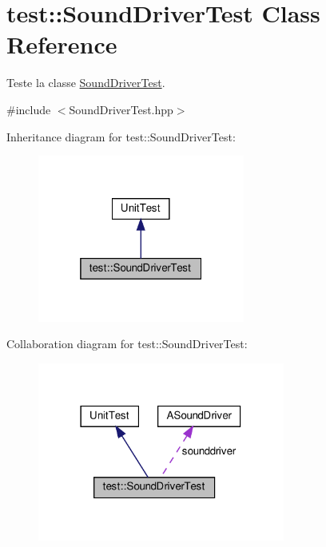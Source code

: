 \hypertarget{classtest_1_1SoundDriverTest}{}\section{test\+:\+:Sound\+Driver\+Test Class Reference}
\label{classtest_1_1SoundDriverTest}


Teste la classe \hyperlink{classtest_1_1SoundDriverTest}{Sound\+Driver\+Test}.  




{\ttfamily \#include $<$Sound\+Driver\+Test.\+hpp$>$}



Inheritance diagram for test\+:\+:Sound\+Driver\+Test\+:
\nopagebreak
\begin{figure}[H]
\begin{center}
\leavevmode
\includegraphics[width=193pt]{classtest_1_1SoundDriverTest__inherit__graph}
\end{center}
\end{figure}


Collaboration diagram for test\+:\+:Sound\+Driver\+Test\+:
\nopagebreak
\begin{figure}[H]
\begin{center}
\leavevmode
\includegraphics[width=230pt]{classtest_1_1SoundDriverTest__coll__graph}
\end{center}
\end{figure}
